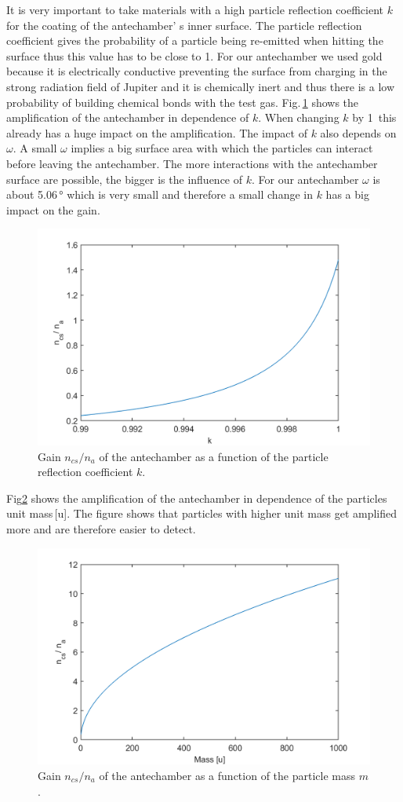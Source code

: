 		It is very important to take materials with a high particle reflection coefficient $k$ for the coating of the antechamber' s inner surface. The particle reflection coefficient gives the probability of a particle being re-emitted when hitting the surface thus this value has to be close to 1. For our antechamber we used gold because it is electrically conductive preventing the surface from charging in the strong radiation field of Jupiter and it is chemically inert and thus there is a low probability of building chemical bonds with the test gas. Fig.\,\ref{th:densEnhk} shows the amplification of the antechamber in dependence of $k$. When changing $k$ by 1\textperthousand\, this already has a huge impact on the amplification. The impact of $k$ also depends on $\omega$. A small $\omega$ implies a big surface area with which the particles can interact before leaving the antechamber. The more interactions with the antechamber surface are possible, the bigger is the influence of $k$. For our antechamber $\omega$ is about 5.06\,\si{\degree} which is very small and therefore a small change in $k$ has a big impact on the gain.\\
		\begin{figure}[h!] %
			\centering
			\includegraphics[width= .7\textwidth]{Bilder/k.png}
			\caption{Gain $n_{cs}/n_a$ of the antechamber as a function of the particle reflection coefficient $k$.}
			\label{th:densEnhk}
		\end{figure}
		Fig\ref{th:densEnhm} shows the amplification of the antechamber in dependence of the particles unit mass\,[u]. The figure shows that particles with higher unit mass get amplified more and are therefore easier to detect.\\
		\begin{figure}[h!] %
			\centering
			\includegraphics[width= .7\textwidth]{Bilder/m.png}
			\caption{Gain $n_{cs}/n_a$ of the antechamber as a function of the particle mass $m$.}
			\label{th:densEnhm}
		\end{figure}
